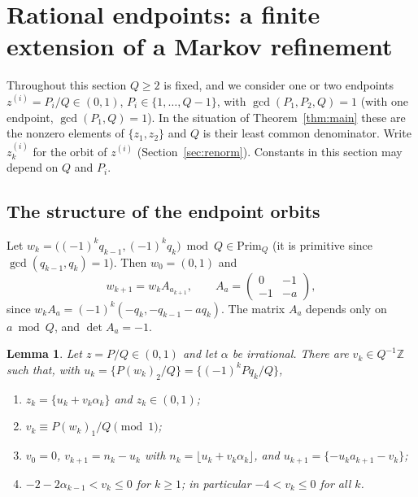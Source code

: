 \documentclass[11pt]{amsart}
\newtheorem{lemma}[theorem]{Lemma}
\theoremstyle{definition}
\numberwithin{equation}{section}
\newcommand{\Z}{\mathbb{Z}}
\newcommand{\fr}[1]{\{#1\}}
\newcommand{\Prim}{\mathrm{Prim}}
\begin{document}
\section{Rational endpoints: a finite extension of a Markov refinement}\label{sec:orbits}

Throughout this section $Q\ge2$ is fixed, and we consider one or two endpoints $z^{(i)}=P_i/Q\in(0,1)$, $P_i\in\{1,\dots,Q-1\}$, with
$\gcd(P_1,P_2,Q)=1$ (with one endpoint, $\gcd(P_1,Q)=1$). In the situation of Theorem~\ref{thm:main} these are the nonzero elements of
$\{z_1,z_2\}$ and $Q$ is their least common denominator. Write $z^{(i)}_k$ for the orbit of $z^{(i)}$ (Section~\ref{sec:renorm}).
Constants in this section may depend on $Q$ and $P_i$.

\subsection{The structure of the endpoint orbits}
Let $w_k=\big((-1)^kq_{k-1},(-1)^kq_k\big)\bmod Q\in\Prim_Q$ (it is primitive since $\gcd(q_{k-1},q_k)=1$). Then $w_0=(0,1)$ and
\begin{equation}\label{eq:wrec}
w_{k+1}=w_kA_{a_{k+1}},\qquad A_a=\begin{pmatrix}0&-1\\-1&-a\end{pmatrix},
\end{equation}
since $w_kA_a=(-1)^k(-q_k,-q_{k-1}-aq_k)$. The matrix $A_a$ depends only on $a\bmod Q$, and $\det A_a=-1$.

\begin{lemma}\label{lem:orbit}
Let $z=P/Q\in(0,1)$ and let $\alpha$ be irrational. There are $v_k\in Q^{-1}\Z$ such that, with $u_k=\fr{P(w_k)_2/Q}=\fr{(-1)^kPq_k/Q}$,
\begin{enumerate}
\item[(i)] $z_k=\fr{u_k+v_k\alpha_k}$ and $z_k\in(0,1)$;
\item[(ii)] $v_k\equiv P(w_k)_1/Q\pmod 1$;
\item[(iii)] $v_0=0$, $v_{k+1}=n_k-u_k$ with $n_k=\lfloor u_k+v_k\alpha_k\rfloor$, and $u_{k+1}=\fr{-u_ka_{k+1}-v_k}$;
\item[(iv)] $-2-2\alpha_{k-1}<v_k\le0$ for $k\ge1$; in particular $-4<v_k\le0$ for all $k$.
\end{enumerate}
\end{lemma}
\end{document}
